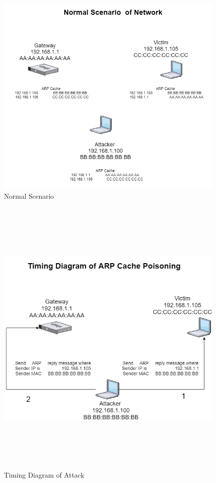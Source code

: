 \documentclass{article}
\begin{document}
\begin{figure}[bp!]
\centering
\includegraphics[width=\textwidth,scale=0.8]{images/Normal_Scenario_of_Diagram.png}
\captioig Normal Scenario 
\end{figure}
\newpage
\begin{figure}[hbp!]
\centering
\includegraphics[width=\textwidth,height=14cm]{images/ARP_Cache_Poisoning_Timing_Diagram.png}
\captioig Timing Diagram of Attack
\end{figure}
\end{document}
